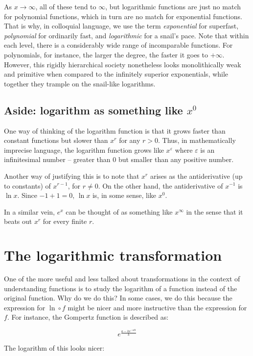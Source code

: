 \documentclass[10pt]{amsart}
\begin{document}
As $x \to \infty$, all of these tend to $\infty$, but logarithmic
functions are just no match for polynomial functions, which in turn
are no match for exponential functions. That is why, in colloquial
language, we use the term {\em exponential} for superfast, {\em
polynomial} for ordinarily fast, and {\em logarithmic} for a snail's
pace. Note that within each level, there is a considerably wide range
of incomparable functions. For polynomials, for instance, the larger
the degree, the faster it goes to $+\infty$. However, this rigidly
hierarchical society nonetheless looks monolithically weak and
primitive when compared to the infinitely superior exponentials, while
together they trample on the snail-like logarithms.

\subsection*{Aside: logarithm as something like $x^0$}

One way of thinking of the logarithm function is that it grows faster
than constant functions but slower than $x^r$ for any $r > 0$. Thus,
in mathematically imprecise language, the logarithm function grows like
$x^\varepsilon$ where $\varepsilon$ is an infinitesimal number -- greater
than $0$ but smaller than any positive number.

Another way of justifying this is to note that $x^r$ arises as the
antiderivative (up to constants) of $x^{r- 1}$, for $r \ne 0$. On the
other hand, the antiderivative of $x^{-1}$ is $\ln x$. Since $-1 + 1 =
0$, $\ln x$ is, in some sense, like $x^0$.

In a similar vein, $e^x$ can be thought of as something like
$x^\infty$ in the sense that it beats out $x^r$ for every finite $r$.

\section{The logarithmic transformation}

One of the more useful and less talked about transformations in the
context of understanding functions is to study the logarithm of a
function instead of the original function. Why do we do this? In some
cases, we do this because the expression for $\ln \circ f$ might be
nicer and more instructive than the expression for $f$. For instance,
the Gompertz function is described as:

$$e^{\frac{a - ke^{-abt}}{b}}$$

The logarithm of this looks nicer:
\end{document}
